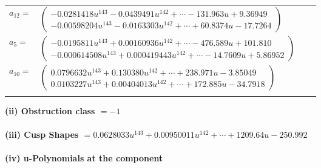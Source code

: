 \documentclass[1p]{elsarticle_modified}
\theoremstyle{definition}
\begin{document}
\begin{tabular}{m{7pt} m{180pt} m{7pt} m{180pt} }
\flushright $a_{12}=$&$\begin{pmatrix}-0.0281418 u^{143}-0.0439491 u^{142}+\cdots-131.963 u+9.36949\\-0.00598204 u^{143}-0.0163303 u^{142}+\cdots+60.8374 u-17.7264\end{pmatrix}$ \\
\flushright $a_{5}=$&$\begin{pmatrix}-0.0195811 u^{143}+0.00160936 u^{142}+\cdots-476.589 u+101.810\\-0.000614508 u^{143}+0.000419443 u^{142}+\cdots-14.7609 u+5.86952\end{pmatrix}$ \\
\flushright $a_{10}=$&$\begin{pmatrix}0.0796632 u^{143}+0.130380 u^{142}+\cdots+238.971 u-3.85049\\0.0103227 u^{143}+0.00404013 u^{142}+\cdots+172.885 u-34.7918\end{pmatrix}$\\&\end{tabular}
\flushleft \textbf{(ii) Obstruction class $= -1$}\\~\\
\flushleft \textbf{(iii) Cusp Shapes $= 0.0628033 u^{143}+0.00950011 u^{142}+\cdots+1209.64 u-250.992$}\\~\\
\newpage\renewcommand{\arraystretch}{1}
\flushleft \textbf{(iv) u-Polynomials at the component}\newline \\
\end{document}
